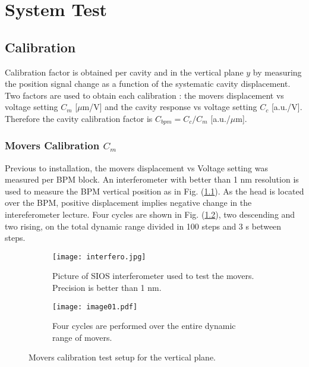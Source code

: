 \chapter{System Test}
\section{Calibration}\label{s:cals}
Calibration factor is obtained per cavity and in the vertical plane $y$ by measuring the position signal change as a function of the systematic cavity displacement. Two factors are used to obtain each calibration : the movers displacement vs voltage setting $C_m$ [$\mu$m/V] and the cavity response vs voltage setting $C_c$ [a.u./V]. Therefore the cavity calibration factor is $C_{bpm}=C_c/C_m$ [a.u./$\mu$m].\par
\subsection{Movers Calibration $C_m$}\label{s:calcm}
Previous to installation, the movers displacement vs Voltage setting was measured per BPM block. An interferometer with better than 1 nm resolution is used to measure the BPM vertical position as in Fig. (\ref{f:interfero}). As the head is located over the BPM, positive displacement implies negative change in the intereferometer lecture. Four cycles are shown in Fig. (\ref{f:fourcycles}), two descending and two rising, on the total dynamic range divided in 100 steps and 3 s between steps.\par
\begin{figure}[!htb]
\centering
\begin{subfigure}[b]{0.3\textwidth}
\texttt{[image: interfero.jpg]}\caption{Picture of SIOS interferometer used to test the movers. Precision is better than 1 nm.}\label{f:interfero}
\end{subfigure}\hspace*{1cm}
\begin{subfigure}[b]{0.5\textwidth}
\texttt{[image: image01.pdf]}\caption{Four cycles are performed over the entire dynamic range of movers.}\label{f:fourcycles}
\end{subfigure}\caption{Movers calibration test setup for the vertical plane.}\label{f:cmtest}
\end{figure}
